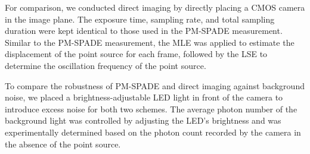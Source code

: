 \documentclass[aps,pra,10pt,showpacs,amsmath,amssymb,floatfix,superscriptaddress,twocolumn]{revtex4-2}
\begin{document}
For comparison, we conducted direct imaging by directly placing a CMOS camera in the image plane.
The exposure time, sampling rate, and total sampling duration were kept identical to those used in the PM-SPADE measurement.
Similar to the PM-SPADE measurement, the MLE was applied to estimate the displacement of the point source for each frame, followed by the LSE to determine the oscillation frequency of the point source.


To compare the robustness of PM-SPADE and direct imaging against background noise, we placed a brightness-adjustable LED light in front of the camera to introduce excess noise for both two schemes.
The average photon number of the background light was controlled by adjusting the LED's brightness and was experimentally determined based on the photon count recorded by the camera in the absence of the point source.
\end{document}
